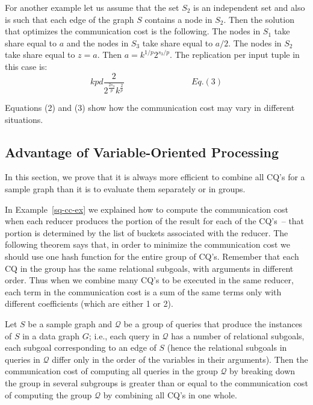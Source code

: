 \begin{example}
For another example let us assume that  the set $S_2$ is an independent set and also
is such that each edge
of the graph $S$ contains a node in $S_2$. Then the solution
that optimizes the communication cost is the following.
The nodes
in $S_1$ take share equal to $a$ and the nodes in
$S_3$ take share equal to $a/2$. The nodes in $S_2$ take share equal to $z=a$.
Then $a=k^{1/p}2^{s_3/p}$.
The replication per input tuple in this case is:
$$kpd\frac{2}{2^{\frac{2s_3}{p}}k^{\frac{2}{p}}} ~~~~~~~~~~~~~~~~~~~~~~~~~~~~~~~~~~~~Eq. (3)$$
\end{example}
Equations (2) and (3) show how the communication cost may vary in different situations.

\subsection{Advantage of Variable-Oriented Processing}
\label{combine-app}

In this section, we prove that it is always more efficient to combine all CQ's for a sample graph than it is to evaluate them separately or in groups.


In Example~\ref{sq-cc-ex} we explained how to compute the communication cost
when each reducer produces the portion of the result for each of the CQ's~-- that
portion is determined by the list of buckets associated with the reducer.
The following theorem says that, in order to minimize the communication cost
we should use one hash function for the entire group of CQ's. Remember that
each CQ in the group has the same relational subgoals, with arguments in
different order.  Thus when we combine many CQ's to be executed in the same
reducer, each term in the communication cost is a sum of the same terms only
with different coefficients (which are either 1 or 2).

\begin{theorem}
\label{group-th}
Let $S$ be a sample graph and ${\mathcal{Q}}$ be a group of queries that produce the instances of $S$ in a data graph $G$; i.e.,  each query in ${\mathcal{Q}}$ has a number of relational subgoals, each subgoal corresponding to an edge of $S$ (hence the relational subgoals in queries in ${\mathcal{Q}}$ differ only in the order of the variables in their arguments).
Then the communication cost of computing all queries in the group ${\mathcal{Q}}$ by breaking down the group in several subgroups is greater than or equal to the communication cost of computing the group ${\mathcal{Q}}$ by combining all CQ's in one whole.
\end{theorem}

